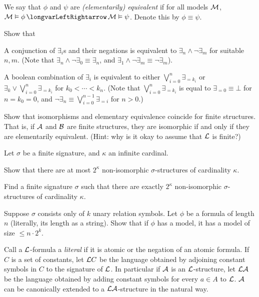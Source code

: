 \eprob

We say that $\phi$ and $\psi$ are {\it (elementarily) equivalent} if for all models ${\cal M}$, $\c M\vDash\phi\iff\c M\vDash\psi$.
Denote this by $\phi\equiv\psi$.

\bprob

    Show that
    \benum
        \item A conjunction of $\exists_i$s and their negations is equivalent to $\exists_n\land\neg\exists_m$ for suitable $n,m$.
        (Note that $\exists_n\land\neg\exists_0\equiv\exists_n$, and $\exists_1\land\neg\exists_m\equiv\neg\exists_m$).
        \item A boolean combination of $\exists_i$ is equivalent to either $\bigvee_{i=0}^n\exists_{=k_i}$ or $\exists_k\lor\bigvee_{i=0}^n\exists_{=k_i}$ for $k_0<\cdots<k_n$.
        (Note that $\bigvee_{i=0}^n\exists_{=k_i}$ is equal to $\exists_{=0}\equiv\bot$ for $n=k_0=0$, and $\neg\exists_n\equiv\bigvee_{i=0}^{n-1}\exists_{=i}$ for $n>0$.)
    \eenum

\eprob

\bprob

    Show that isomorphisms and elementary equivalence coincide for finite structures.
    That is, if ${\cal A}$ and ${\cal B}$ are finite structures, they are isomorphic if and only if they are elementarily equivalent.
    (Hint: why is it okay to assume that ${\cal L}$ is finite?)

\eprob

\bprob

    Let $\sigma$ be a finite signature, and $\kappa$ an infinite cardinal.
    \benum
        \item Show that there are at most $2^\kappa$ non-isomorphic $\sigma$-structures of cardinality $\kappa$.
        \item Find a finite signature $\sigma$ such that there are exactly $2^\kappa$ non-isomorphic $\sigma$-structures of cardinality $\kappa$.
        \item Suppose $\sigma$ consists only of $k$ unary relation symbols.
        Let $\phi$ be a formula of length $n$ (literally, its length as a string).
        Show that if $\phi$ has a model, it has a model of size $\leq n\cdot2^k$.
    \eenum

\eprob

\bprob

    Call a ${\cal L}$-formula a {\it literal} if it is atomic or the negation of an atomic formula.
    If $C$ is a set of constants, let ${\cal L}C$ be the language obtained by adjoining constant symbols in $C$ to the signature of ${\cal L}$.
    In particular if ${\cal A}$ is an ${\cal L}$-structure, let ${\cal L}{\cal A}$ be the language obtained by adding constant symbols for every $a\in A$ to ${\cal L}$.
    ${\cal A}$ can be canonically extended to a ${\cal L}{\cal A}$-structure in the natural way.

